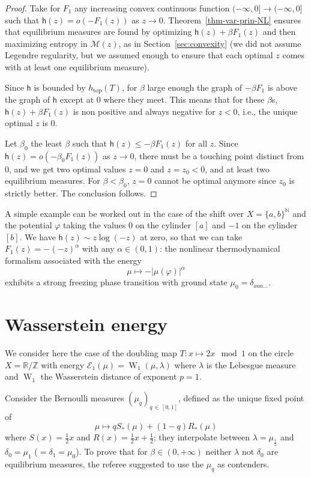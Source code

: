 \documentclass[10pt]{amsart}
\theoremstyle{definition}\newtheorem{defi}[theo]{Definition}\newtheorem{rema}[theo]{Remark}\newtheorem{exam}[theo]{Example}\newtheorem{exem}[theo]{Example}\newtheorem{nota}[theo]{Notation}
\theoremstyle{plain}
\theoremstyle{plain}
\renewcommand\top{{\mathrm{top}}}
\newcommand{\wass}{\operatorname{W}}
\newcommand{\hf}{\mathsf{h}}
\newcommand{\pot}{\varphi}
\newcommand*\be{\beta}
\newcommand*\8{\infty}
\newcommand\NN{\mathbb{N}}
\newcommand\RR{\mathbb{R}}
\newcommand\ZZ{\mathbb{Z}}
\newcommand{\En}{\mathcal{E}}
\newcommand{\cM}{\mathcal{M}}
\begin{document}
\begin{proof}
Take for $F_1$ any increasing convex continuous function $(-\infty,0]\to(-\infty,0]$ such that $\hf(z) = o(-F_1(z))$ as $z\to 0$. Theorem~\ref{thm-var-prin-NL} ensures that equilibrium measures are found by optimizing $\hf(z)+\beta F_1(z)$ and then maximizing entropy in $\cM(z)$, as in Section~\ref{sec:convexity} (we did not assume Legendre regularity, but we assumed enough to ensure that each optimal $z$ comes with at least one equilibrium measure).

Since $\hf$ is bounded by $h_\top(T)$, for $\beta$ large enough the graph of $-\beta F_1$ is above the graph of $\hf$ except at $0$ where they meet. This means that for these $\be$s, $\hf(z)+\be F_1(z)$ is non positive and always negative for $z<0$, i.e., the unique optimal $z$ is $0$.

Let $\beta_0$ the least $\beta$ such that $\hf(z)\le -\beta F_1(z)$ for all $z$. Since $\hf(z) = o(-\beta_0 F_1(z))$ as $z\to 0$, there must be a touching point distinct from $0$, and we get two optimal values $z=0$ and $z=z_0<0$, and at least two equilibrium measures. For $\beta<\beta_0$, $z=0$ cannot be optimal anymore since $z_0$ is strictly better. The conclusion follows.
\end{proof}

A simple example can be worked out in the case of the shift over $X=\{a,b\}^{\NN}$ and the potential $\pot$ taking the values $0$ on the cylinder $[a]$ and $-1$ on the cylinder $[b]$. We have $\hf(z) \sim z\log(-z)$ at zero, so that we can take $F_1(z) = -(-z)^\alpha$ with any $\alpha\in(0,1)$: the nonlinear thermodynamical formalism associated with the energy
\[
\mu\mapsto -\lvert \mu(\pot)\rvert^\alpha
\]
exhibits a strong freezing phase transition with ground state $\mu_0=\delta_{aaa\dots}$.



\appendix
\section{Wasserstein energy}\label{sec-appendix}


We consider here the case of the doubling map $T:x\mapsto 2x\mod 1$ on the circle $X=\RR/\ZZ$ with energy $\En_1(\mu) = \wass_1(\mu,\lambda)$ where $\lambda$ is the Lebesgue measure and $\wass_1$ the Wasserstein distance of exponent $p=1$.

Consider the Bernoulli measures $(\mu_q)_{q\,\in\,[0,1]}$, defined as the unique fixed point of
\[
\mu\mapsto q S_*(\mu) + (1-q) R_*(\mu)
\]
where $S(x)=\frac12 x$ and $R(x)=\frac12 x+\frac12$; they interpolate between $\lambda=\mu_{\frac12}$ and $\delta_0=\mu_1$ ($=\delta_1=\mu_0$). To prove that for $\beta\in(0,+\infty)$ neither $\lambda$ not $\delta_0$ are equilibrium measures, the referee suggested to use the $\mu_q$ as contenders.
\end{document}
